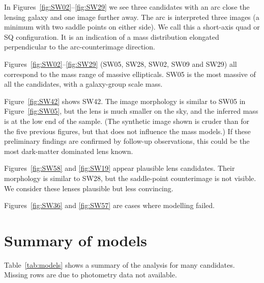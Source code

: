 \documentclass[fleqn,usenatbib]{mnras}
\newcommand{\figref}[1]{\ref{fig:#1}}
\begin{document}
In Figures~\figref{SW02}--\figref{SW29} we see three candidates with
an arc close the lensing galaxy and one image further away.  The arc
is interpreted three images (a minimum with two saddle points on
either side).  We call this a short-axis quad or SQ configuration.  It
is an indication of a mass distribution elongated perpendicular to the
arc-counterimage direction.

Figures~\figref{SW02}--\figref{SW29} (SW05, SW28, SW02, SW09 and SW29)
all correspond to the mass range of massive ellipticals.  SW05 is the
most massive of all the candidates, with a galaxy-group scale mass.

Figure~\figref{SW42} shows SW42.  The image morphology is similar to
SW05 in Figure~\figref{SW05}, but the lens is much smaller on the sky,
and the inferred mass is at the low end of the sample.  (The synthetic
image shown is cruder than for the five previous figures, but that
does not influence the mass models.)  If these preliminary findings
are confirmed by follow-up observations, this could be the most
dark-matter dominated lens known.

Figures~\figref{SW58} and \figref{SW19} appear plausible lens
candidates.  Their morphology is similar to SW28, but the saddle-point
counterimage is not visible.  We consider these lenses plausible but
less convincing.

Figures~\figref{SW36} and \figref{SW57} are cases where modelling
failed.

\section{Summary of models}\label{sec:summary}

Table~\ref{tab:models} shows a summary of the analysis for many candidates.
Missing rows are due to photometry data not available.
\end{document}
